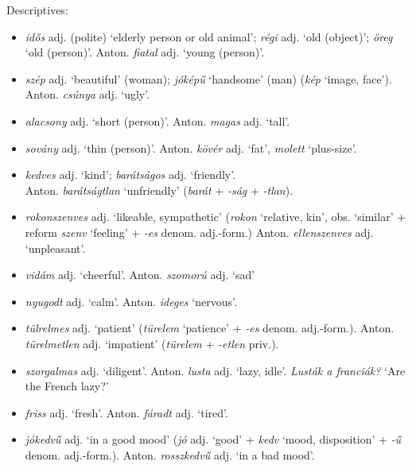 \documentclass[a4paper,11pt]{article}
\begin{document}
\noindent Descriptives:
\begin{itemize}

  \item \emph{idős} adj. (polite) `elderly person or old animal';
    \emph{régi} adj. `old (object)'; \emph{öreg} `old
    (person)'. Anton. \emph{fiatal} adj. `young (person)'.

  \item \emph{szép} adj. `beautiful' (woman); \emph{jóképű} `handsome'
    (man) (\emph{kép} `image, face'). Anton. \emph{csúnya}
    adj. `ugly'.

  \item \emph{alacsony} adj. `short
    (person)'. Anton. \emph{magas} adj. `tall'.

  \item \emph{sovány} adj. `thin (person)'. Anton. \emph{kövér}
    adj. `fat', \emph{molett} `plus\hyp{}size'.

  \item \emph{kedves} adj. `kind'; \emph{barátságos}
    adj. `friendly'. \\ Anton. \emph{barátságtlan} `unfriendly'
    (\emph{barát} + \emph{-ság} + \emph{-tlan}).

  \item \emph{rokonszenves} adj. `likeable, sympathetic' (\emph{rokon}
    `relative, kin', obs. `similar' + reform \emph{szenv} `feeling' +
    \emph{-es} denom. adj.-form.) Anton. \emph{ellenszenves} adj.
    `unpleasant'.

  \item \emph{vidám} adj. `cheerful'. Anton. \emph{szomorú} adj. `sad'

  \item \emph{nyugodt} adj. `calm'. Anton. \emph{ideges} `nervous'.

  \item \emph{tülrelmes} adj. `patient' (\emph{türelem} `patience' +
    \emph{-es} denom. adj.-form.). Anton. \emph{türelmetlen} adj.
    `impatient' (\emph{türelem} + \emph{-etlen} priv.).

  \item \emph{szorgalmas} adj. `diligent'. Anton. \emph{lusta}
    adj. `lazy, idle'. \emph{Lusták a franciák?} `Are the French
    lazy?'

  \item \emph{friss} adj. `fresh'. Anton. \emph{fáradt} adj. `tired'.

  \item \emph{jókedvű} adj. `in a good mood' (\emph{jó}
    adj. `good' + \emph{kedv} `mood, disposition' + \emph{-ű}
    denom. adj.-form.). Anton. \emph{rosszkedvű}
    adj. `in a bad mood'.


\end{itemize}
\end{document}
